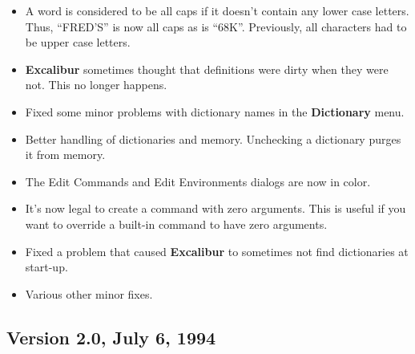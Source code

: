 ﻿\documentclass[11pt,titlepage]{article}
\newcommand{\ex}{\textbf{Excalibur}}
\begin{document}
\begin{itemize}
\item A word is considered to be all caps if it doesn't contain any
  lower case letters.  Thus, ``FRED'S'' is now all caps as is ``68K''.
  Previously, all characters had to be upper case letters.

\item \ex{} sometimes thought that definitions were dirty when they
  were not.  This no longer happens.

\item Fixed some minor problems with dictionary names in the
  \textbf{Dictionary} menu.

\item Better handling of dictionaries and memory.  Unchecking a
  dictionary purges it from memory.

\item The Edit Commands and Edit Environments dialogs are now in
  color.

\item It's now legal to create a command with zero arguments.  This is
  useful if you want to override a built-in command to have zero
  arguments.

\item Fixed a problem that caused \ex{} to sometimes not find
  dictionaries at start-up.

\item Various other minor fixes.

\end{itemize}

\subsection{Version 2.0, July 6, 1994}
\end{document}
